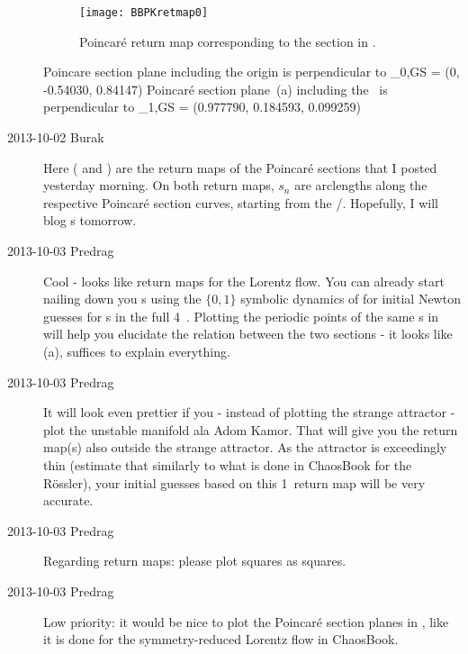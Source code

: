 \begin{description}
\begin{figure}%
  \begin{center}
  \texttt{[image: BBPKretmap0]}
  \end{center}
  \caption{
	Poincar\'e return map corresponding to the section in .
    }
  \label{fig:BBPKretmap0}
\end{figure}

Poincare section plane  including the origin is
perpendicular to
\beq
	_{0,GS} = (0, -0.54030, 0.84147)
	\label{eq:nhat0GS}
\eeq
Poincar\'e section plane \,(a) including the \reqv\ is
perpendicular to
\beq
	_{1,GS} = (0.977790, 0.184593, 0.099259)
	\label{eq:nhat1GS}
\eeq

\item[2013-10-02 Burak] Here ( and )
are the return maps of the Poincar\'e sections that I posted yesterday morning.
On both return maps, $s_n$ are arclengths along the respective Poincar\'e
section curves, starting from the \eqv /\reqv. Hopefully, I will blog \rpo s tomorrow.

\item[2013-10-03 Predrag] Cool - looks like return maps for the
Lorentz flow. You can already start nailing down you \rpo s using the
$\{0,1\}$ symbolic dynamics of  for initial
Newton guesses for \rpo s in the full 4\dmn\ \statesp. Plotting the
periodic points of the same \rpo s in    will
help you elucidate the relation between the two sections - it looks
like \,(a), suffices to explain everything.

\item[2013-10-03 Predrag] It will look even prettier if you - instead
of plotting the strange attractor - plot the unstable manifold ala
Adom Kamor. That will give you the return map(s) also outside the
strange attractor. As the attractor is exceedingly thin (estimate
that similarly to what is done in ChaosBook for the R\"ossler), your
initial guesses based on this 1\dmn\ return map will be very
accurate.

\item[2013-10-03 Predrag] Regarding return maps: please plot squares as squares.

\item[2013-10-03 Predrag] Low priority: it would be nice to plot the
Poincar\'e section planes in , like it is
done for the symmetry-reduced Lorentz flow in ChaosBook.


\end{description}
